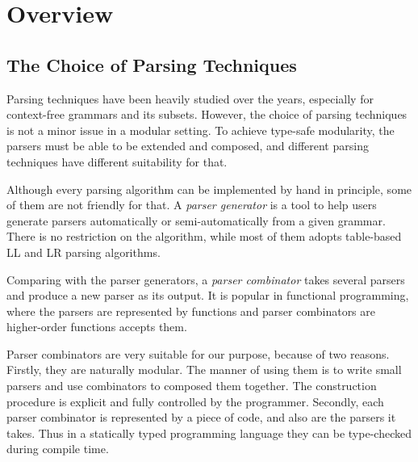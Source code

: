 \section{Overview}\label{sec:overview}

\subsection{The Choice of Parsing Techniques}\label{subsec:overview-parsing}

Parsing techniques have been heavily studied over the years, especially for context-free grammars and its subsets. However, the choice of parsing techniques is not a minor issue in a modular setting. To achieve type-safe modularity, the parsers must be able to be extended and composed, and different parsing techniques have different suitability for that.

Although every parsing algorithm can be implemented by hand in principle, some of them are not friendly for that. A \textit{parser generator} is a tool to help users generate parsers automatically or semi-automatically from a given grammar. There is no restriction on the algorithm, while most of them adopts table-based LL and LR parsing algorithms.


Comparing with the parser generators, a \textit{parser combinator} takes several parsers and produce a new parser as its output. It is popular in functional programming, where the parsers are represented by functions and parser combinators are higher-order functions accepts them.

Parser combinators are very suitable for our purpose, because of two reasons. Firstly, they are naturally modular. The manner of using them is to write small parsers and use combinators to composed them together. The construction procedure is explicit and fully controlled by the programmer. Secondly, each parser combinator is represented by a piece of code, and also are the parsers it takes. Thus in a statically typed programming language they can be type-checked during compile time.

